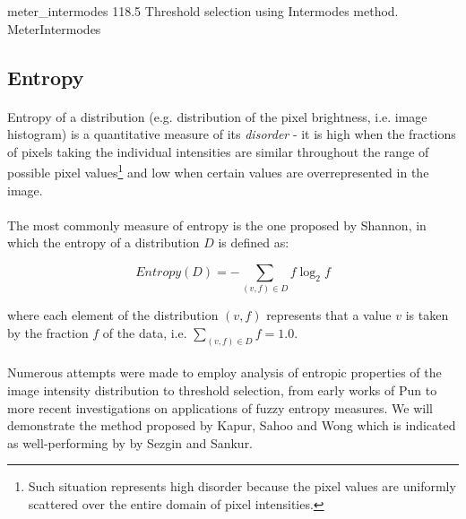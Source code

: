 \thresholdFigure
{meter_intermodes}
{118.5}
{Threshold selection using Intermodes method.}
{MeterIntermodes}




\subsection{Entropy}

\paragraph*{}
Entropy of a distribution (e.g. distribution of the pixel brightness, i.e. image histogram) is a quantitative measure of its \textit{disorder} - it is high when the fractions of pixels taking the individual intensities are similar throughout the range of possible pixel values\footnote{Such situation represents high disorder because the pixel values are uniformly scattered over the entire domain of pixel intensities.} and low when certain values are overrepresented in the image.

\paragraph*{}
The most commonly measure of entropy is the one proposed by Shannon, in which the entropy of a distribution  $D$ is defined as:

\[
	Entropy(D) = - \sum_{(v,f) \in D}f \log_2{f}
\]

where each element of the distribution $(v,f)$ represents that a value $v$ is taken by the fraction $f$ of the data, i.e. $\sum_{(v,f) \in D} f = 1.0$.

\paragraph*{}
Numerous attempts were made to employ analysis of entropic properties of the image intensity distribution to threshold selection, from early works of Pun to more recent investigations on applications of fuzzy entropy measures. We will demonstrate the method proposed\cite{KapurSahooWong85} by Kapur, Sahoo and Wong which is indicated\cite{SezginSankur04} as well-performing by by Sezgin and Sankur.

